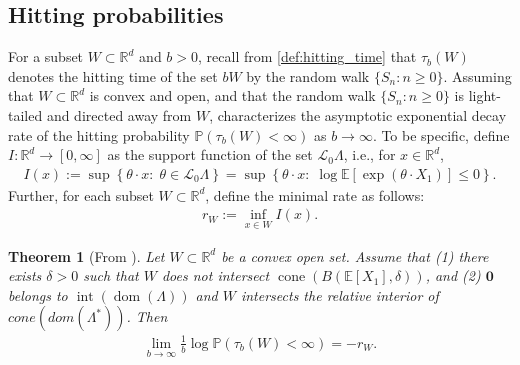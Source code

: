 \documentclass[aap,preprint]{imsart}
\newcommand{\Pro}{{\mathbb{P}}}
\newcommand{\Exp}{{\mathbb{E}}}
\newcommand{\bR}{{\mathbb{R}}}
\theoremstyle{plain}
\newtheorem{theorem}{Theorem}[section]
\theoremstyle{definition}
\begin{document}
\subsection{Hitting probabilities}
For a subset $W \subset \bR^d$ and $b > 0$, recall from \eqref{def:hitting_time}  that  $\tau_b(W)$ denotes  the hitting time of the set $bW$ by the random walk $\{S_n : n \geq 0\}$. %
Assuming that $W \subset \mathbb{R}^d$ is  convex and open, and that  the random walk $\{S_n : n \geq 0\}$ is light-tailed and directed away from $W$, 
 \cite{collamore1996} characterizes  the asymptotic exponential decay rate of the hitting probability $\Pro\left( \tau_b(W) < \infty \right)$ as $b \to \infty$. To be specific, define $I : \mathbb{R}^d \to [0, \infty]$ as the support function of the set $\mathcal{L}_0 \Lambda$, i.e., for $x \in \bR^d$,
\begin{align}\label{def:rate_function}
I(x) :=\sup\left\{\theta \cdot x:\; \theta \in \mathcal{L}_0 \Lambda \right\}  = \sup\left\{\theta \cdot x:\; \log \Exp[\exp(\theta \cdot X_1)] \leq 0 \right\}.
\end{align}
Further, for each subset $W \subset \bR^d$, define the minimal rate as follows:
\begin{align}\label{def:r_W}
    r_W := \inf_{x \in W} I(x).
\end{align}


\begin{theorem}[From \cite{collamore1996}]\label{thm:Collomore_prob}
Let $W \subset \mathbb{R}^d$ be a convex open set. 
 Assume that (1) there exists  
 $\delta > 0$ such that $W$ does not intersect $\operatorname{cone}(B(\Exp[X_1], \delta))$, 
 and (2)  $\textbf{0}$ belongs to $\operatorname{int}(\operatorname{dom}(\Lambda))$ and  
$W$ intersects the relative interior of $cone(dom(\Lambda^*))$. Then
\begin{align*}
\lim_{b \to \infty}    \frac{1}{b} \log \Pro(\tau_b(W) < \infty)  =- r_W.
\end{align*}
\end{theorem} 

\end{document}
